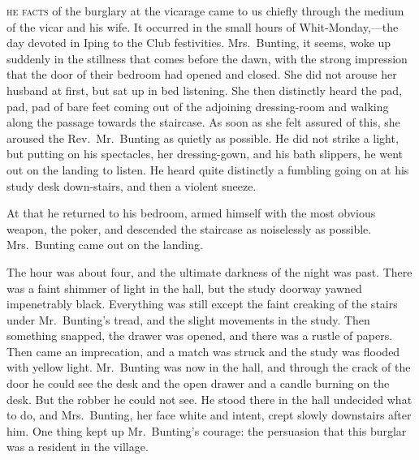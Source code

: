 \label{ch:05}
\begin{ChapterStart}
\vspace*{2\nbs}

\vspace{1.5\nbs}
\vspace{0.75\nbs}
\end{ChapterStart}

\kern-3pt\textsc{he facts} of the burglary at the vicarage came to us chiefly through the medium of the vicar and his wife. It occurred in the small hours of Whit-Monday,—the day devoted in Iping to the Club festivities. Mrs.\ Bunting, it seems, woke up suddenly in the stillness that comes before the dawn, with the strong impression that the door of their bedroom had opened and closed. She did not arouse her husband at first, but sat up in bed listening. She then distinctly heard the pad, pad, pad of bare feet coming out of the adjoining dressing-room and walking along the passage towards the staircase. As soon as she felt assured of this, she aroused the Rev.\ Mr.\ Bunting as quietly as possible. He did not strike a light, but putting on his spectacles, her dressing-gown, and his bath slippers, he went out on the landing to listen. He heard quite distinctly a fumbling going on at his study desk down-stairs, and then a violent sneeze.

At that he returned to his bedroom, armed himself with the most obvious weapon, the poker, and descended the staircase as noiselessly as possible. Mrs.\ Bunting came out on the landing.

The hour was about four, and the ultimate darkness of the night was past. There was a faint shimmer of light in the hall, but the study doorway yawned impenetrably black. Everything was still except the faint creaking of the stairs under Mr.\ Bunting’s tread, and the slight movements in the study. Then something snapped, the drawer was opened, and there was a rustle of papers. Then came an imprecation, and a match was struck and the study was flooded with yellow light. Mr.\ Bunting was now in the hall, and through the crack of the door he could see the desk and the open drawer and a candle burning on the desk. But the robber he could not see. He stood there in the hall undecided what to do, and Mrs.\ Bunting, her face white and intent, crept slowly downstairs after him. One thing kept up Mr.\ Bunting’s courage: the persuasion that this burglar was a resident in the village.

